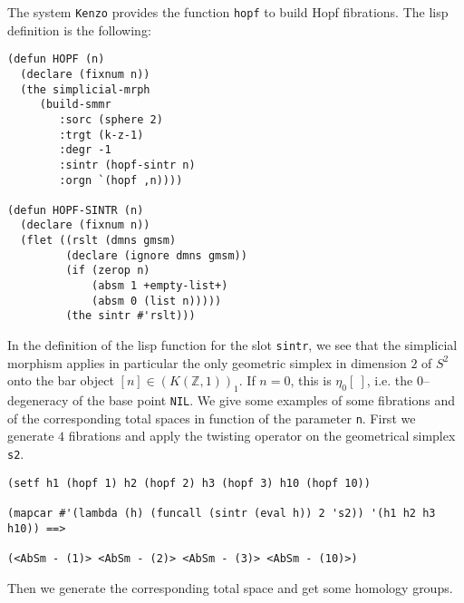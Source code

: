 \newpage
The system {\tt Kenzo} provides the function {\tt hopf} to build
Hopf fibrations. The lisp definition is the following:
{\footnotesize\begin{verbatim}
(defun HOPF (n)
  (declare (fixnum n))
  (the simplicial-mrph
     (build-smmr
        :sorc (sphere 2)
        :trgt (k-z-1)
        :degr -1
        :sintr (hopf-sintr n)
        :orgn `(hopf ,n))))

(defun HOPF-SINTR (n)
  (declare (fixnum n))
  (flet ((rslt (dmns gmsm)
         (declare (ignore dmns gmsm))
         (if (zerop n)
             (absm 1 +empty-list+)
             (absm 0 (list n)))))
         (the sintr #'rslt)))
\end{verbatim}}
In the definition of the lisp function for the slot {\tt sintr}, we see that the simplicial morphism
applies in particular the only geometric simplex in dimension $2$ of $S^2$ onto the bar object
$[n] \in (K(\mathbb{Z},1))_1$. If $n=0$, this is $\eta_0 [\ ]$, i.e. the $0$--degeneracy of the base point
{\tt NIL}. We give some examples of some fibrations and of the corresponding total spaces in function of the
parameter {\tt n}. First we generate $4$ fibrations and apply the twisting operator
on the geometrical simplex {\tt s2}.
{\footnotesize\begin{verbatim}
(setf h1 (hopf 1) h2 (hopf 2) h3 (hopf 3) h10 (hopf 10))

(mapcar #'(lambda (h) (funcall (sintr (eval h)) 2 's2)) '(h1 h2 h3 h10)) ==>

(<AbSm - (1)> <AbSm - (2)> <AbSm - (3)> <AbSm - (10)>)
\end{verbatim}}
Then we generate the corresponding total space and get some homology groups.
